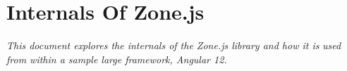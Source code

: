 \chapter{Internals Of Zone.js}

\emph{This document explores the internals of the Zone.js library and how it is}
\emph{used from within a sample large framework, Angular 12.}












